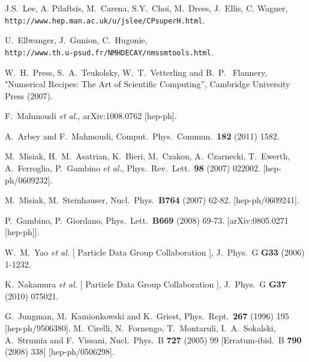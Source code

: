 \documentclass[12pt,a4paper]{article}
\begin{document}
\begin{thebibliography}{}
  J.S.~Lee, A. Pilaftsis, M.~Carena, S.Y.~Choi, M.~Drees, J.~Ellis, C. Wagner,\\
  \verb|http://www.hep.man.ac.uk/u/jslee/CPsuperH.html|.
  
  U.~Ellwanger, J.~Gunion, C.~Hugonie,\\
  \verb|http://www.th.u-psud.fr/NMHDECAY/nmssmtools.html|.


W.~H.~Press, S.~A.~Teukolsky,
W.~T.~Vetterling and  B.~P.~ Flannery,  
"Numerical Recipes: The Art of Scientific Computing'', Cambridge University
Press (2007).

  F.~Mahmoudi {\it et al.},
  arXiv:1008.0762 [hep-ph].

  A.~Arbey and F.~Mahmoudi,
  Comput.\ Phys.\ Commun.\  {\bf 182} (2011) 1582.

  M.~Misiak, H.~M.~Asatrian, K.~Bieri, M.~Czakon, A.~Czarnecki, T.~Ewerth, A.~Ferroglia, P.~Gambino {\it et al.},
  Phys.\ Rev.\ Lett.\  {\bf 98 } (2007)  022002.
  [hep-ph/0609232].

  M.~Misiak, M.~Steinhauser,
  Nucl.\ Phys.\  {\bf B764 } (2007)  62-82.
  [hep-ph/0609241].

  P.~Gambino, P.~Giordano,
  Phys.\ Lett.\  {\bf B669 } (2008)  69-73.
  [arXiv:0805.0271 [hep-ph]].

  W.~M.~Yao {\it et al.} [ Particle Data Group Collaboration ],
  J.\ Phys.\ G {\bf G33 } (2006)  1-1232.

  K.~Nakamura {\it et al.} [ Particle Data Group Collaboration ],
  J.\ Phys.\ G {\bf G37 } (2010)  075021.
  
  G.~Jungman, M.~Kamionkowski and K.~Griest,
  Phys.\ Rept.\  {\bf 267} (1996) 195
  [hep-ph/9506380].
  M.~Cirelli, N.~Fornengo, T.~Montaruli, I.~A.~Sokalski, A.~Strumia and
F.~Vissani,
  Nucl.\ Phys.\ B {\bf 727} (2005) 99
   [Erratum-ibid.\ B {\bf 790} (2008) 338]
  [hep-ph/0506298].



\end{thebibliography}
\end{document}
